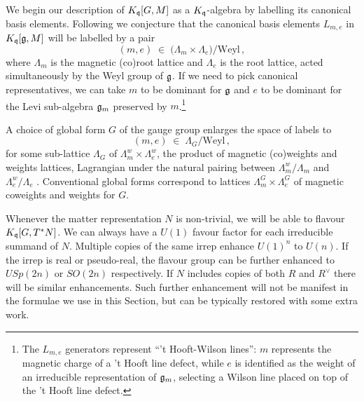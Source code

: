 \documentclass[12pt]{amsart}
\begin{document}
We begin our description of $K_{\mathfrak{q}}[G,M]$ as a $K_{\mathfrak{q}}$-algebra by labelling its canonical basis elements. Following  
\cite{Kapustin:2007wm,Kapustin:2006hi} we conjecture that the canonical basis elements $L_{m,e}$ in $K_{\mathfrak{q}}[\mathfrak{g},M]$ will be labelled by a pair \begin{equation}
	(m,e) \;\in\; \big(\Lambda_m \times \Lambda_e\big)/\mathrm{Weyl} \,,
\end{equation} 
where $\Lambda_m$ is the magnetic (co)root lattice and $\Lambda_e$ is the root lattice, acted simultaneously by the Weyl group of $\mathfrak{g}$. If we need to pick canonical representatives, we can take $m$ to be dominant for $\mathfrak{g}$ and $e$ to be dominant for the Levi sub-algebra $\mathfrak{g}_m$ preserved by $m$.\footnote{The $L_{m,e}$ generators represent ``'t Hooft-Wilson lines'': $m$ represents the magnetic charge of a 't Hooft line defect, while $e$ is identified as the weight of an irreducible representation of $\mathfrak{g}_m$, selecting a Wilson line placed on top of the 't Hooft line defect.} 

A choice of global form $G$ of the gauge group enlarges the space of labels to 
\begin{equation}
	(m,e) \;\in\; \Lambda_G/\mathrm{Weyl} \,,
\end{equation} 
for some sub-lattice $\Lambda_G$ of $\Lambda^{w}_m \times \Lambda^{w}_e$, the product of magnetic (co)weights and weights lattices, Lagrangian under the natural pairing between $\Lambda^{w}_m/\Lambda_m$ and $\Lambda^{w}_e/\Lambda_e$ \cite{Gaiotto:2010be, Aharony:2013hda,Gaiotto:2014kfa}.  Conventional global forms correspond to lattices 
$\Lambda^G_m \times \Lambda^G_e$ of magnetic coweights and weights for $G$. 

Whenever the matter representation $N$ is non-trivial, we will be able to flavour $K_{\mathfrak{q}}[G,T^*N]$. We can always have a $U(1)$ favour factor for each irreducible summand of $N$. Multiple copies of the same irrep enhance $U(1)^n$ to $U(n)$. If the irrep is real or pseudo-real, the flavour group can be further enhanced to $USp(2n)$ or $SO(2n)$ respectively. If $N$ includes copies of both $R$ and $R^\vee$ there will be similar enhancements. Such further enhancement will not be manifest in the formulae we use in this Section, but can be typically restored with some extra work.  
\end{document}
